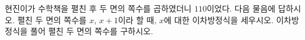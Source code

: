 현진이가 수학책을 펼친 후 두 면의 쪽수를 곱하였더니 $110$이었다. 다음 물음에 답하시오.
 펼친 두 면의 쪽수를 $x$, $x+1$이라 할 때, $x$에 대한 이차방정식을 세우시오.
 이차방정식을 풀어 펼친 두 면의 쪽수를 구하시오.
